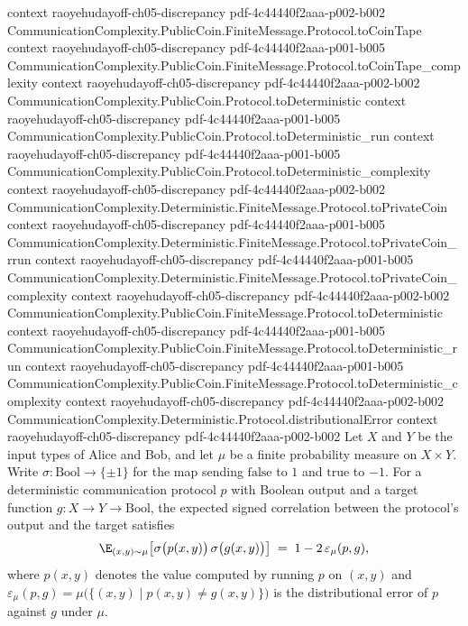 \begin{lemma}
  {context}
  {raoyehudayoff-ch05-discrepancy}
  {pdf-4c44440f2aaa-p002-b002}
\proofstep
  {CommunicationComplexity.PublicCoin.FiniteMessage.Protocol.toCoinTape}
  {context}
  {raoyehudayoff-ch05-discrepancy}
  {pdf-4c44440f2aaa-p001-b005}
\proofstep
  {CommunicationComplexity.PublicCoin.FiniteMessage.Protocol.toCoinTape_complexity}
  {context}
  {raoyehudayoff-ch05-discrepancy}
  {pdf-4c44440f2aaa-p002-b002}
\proofstep
  {CommunicationComplexity.PublicCoin.Protocol.toDeterministic}
  {context}
  {raoyehudayoff-ch05-discrepancy}
  {pdf-4c44440f2aaa-p001-b005}
\proofstep
  {CommunicationComplexity.PublicCoin.Protocol.toDeterministic_run}
  {context}
  {raoyehudayoff-ch05-discrepancy}
  {pdf-4c44440f2aaa-p001-b005}
\proofstep
  {CommunicationComplexity.PublicCoin.Protocol.toDeterministic_complexity}
  {context}
  {raoyehudayoff-ch05-discrepancy}
  {pdf-4c44440f2aaa-p002-b002}
\proofstep
  {CommunicationComplexity.Deterministic.FiniteMessage.Protocol.toPrivateCoin}
  {context}
  {raoyehudayoff-ch05-discrepancy}
  {pdf-4c44440f2aaa-p001-b005}
\proofstep
  {CommunicationComplexity.Deterministic.FiniteMessage.Protocol.toPrivateCoin_rrun}
  {context}
  {raoyehudayoff-ch05-discrepancy}
  {pdf-4c44440f2aaa-p001-b005}
\proofstep
  {CommunicationComplexity.Deterministic.FiniteMessage.Protocol.toPrivateCoin_complexity}
  {context}
  {raoyehudayoff-ch05-discrepancy}
  {pdf-4c44440f2aaa-p002-b002}
\proofstep
  {CommunicationComplexity.PublicCoin.FiniteMessage.Protocol.toDeterministic}
  {context}
  {raoyehudayoff-ch05-discrepancy}
  {pdf-4c44440f2aaa-p001-b005}
\proofstep
  {CommunicationComplexity.PublicCoin.FiniteMessage.Protocol.toDeterministic_run}
  {context}
  {raoyehudayoff-ch05-discrepancy}
  {pdf-4c44440f2aaa-p001-b005}
\proofstep
  {CommunicationComplexity.PublicCoin.FiniteMessage.Protocol.toDeterministic_complexity}
  {context}
  {raoyehudayoff-ch05-discrepancy}
  {pdf-4c44440f2aaa-p002-b002}
\proofstep
  {CommunicationComplexity.Deterministic.Protocol.distributionalError}
  {context}
  {raoyehudayoff-ch05-discrepancy}
  {pdf-4c44440f2aaa-p002-b002}
Let $X$ and $Y$ be the input types of Alice and Bob, and let $\mu$ be a finite
probability measure on $X \times Y$. Write $\sigma \colon \mathrm{Bool} \to \{\pm 1\}$
for the map sending $\mathrm{false}$ to $1$ and $\mathrm{true}$ to $-1$. For a
deterministic communication protocol $p$ with Boolean output and a target function $g
\colon X \to Y \to \mathrm{Bool}$, the expected signed correlation between the
protocol's output and the target satisfies
\[
  \E_{(x,y)\sim\mu}\bigl[\sigma\bigl(p(x,y)\bigr)\,\sigma\bigl(g(x,y)\bigr)\bigr]
  \;=\; 1 - 2\,\varepsilon_\mu(p,g),
\]
where $p(x,y)$ denotes the value computed by running $p$ on $(x,y)$ and
$\varepsilon_\mu(p,g) = \mu\bigl(\{(x,y) \mid p(x,y) \ne g(x,y)\}\bigr)$ is the
distributional error of $p$ against $g$ under $\mu$.
\end{lemma}

